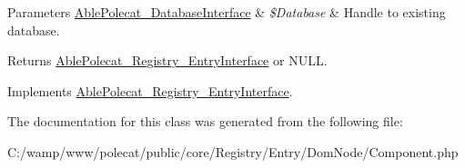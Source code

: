 \begin{DoxyParams}[1]{Parameters}
\hyperlink{interface_able_polecat___database_interface}{Able\+Polecat\+\_\+\+Database\+Interface} & {\em \$\+Database} & Handle to existing database.\\
\hline
\end{DoxyParams}
\begin{DoxyReturn}{Returns}
\hyperlink{interface_able_polecat___registry___entry_interface}{Able\+Polecat\+\_\+\+Registry\+\_\+\+Entry\+Interface} or N\+U\+L\+L. 
\end{DoxyReturn}


Implements \hyperlink{interface_able_polecat___registry___entry_interface_a999eef977eb899167ae02f83dd26a4ae}{Able\+Polecat\+\_\+\+Registry\+\_\+\+Entry\+Interface}.



The documentation for this class was generated from the following file\+:\begin{DoxyCompactItemize}
\item 
C\+:/wamp/www/polecat/public/core/\+Registry/\+Entry/\+Dom\+Node/Component.\+php\end{DoxyCompactItemize}
